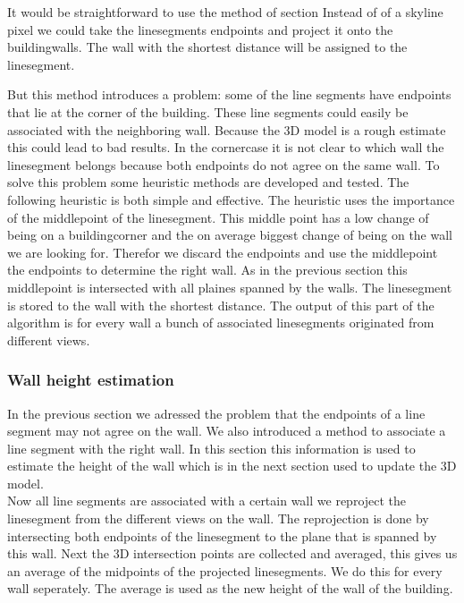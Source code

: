 	It would be straightforward to use the method of section %
	Instead of of a skyline pixel we could take the linesegments endpoints and project it onto the buildingwalls. The wall with the shortest distance will be assigned to the linesegment.

	But this method introduces a problem: some of the line segments have endpoints that lie at the corner of the building. These line segments could easily be associated with the neighboring wall. Because the 3D model is a rough estimate this could lead to bad results.
	In the cornercase it is not clear to which wall the linesegment belongs because both endpoints do not agree on the same wall. To solve this problem some heuristic methods are developed and tested. The following heuristic is both simple and effective.
	The heuristic uses the importance of the middlepoint of the linesegment. This middle point has a low change of being on a buildingcorner and the on average biggest change of being on the wall we are looking for.
	Therefor we discard the endpoints and use the middlepoint the endpoints to determine the right wall.
	As in the previous section %
	this middlepoint is intersected with all plaines spanned by the walls. The linesegment is stored to the wall with the shortest distance.
	The output of this part of the algorithm is for every wall a bunch of associated linesegments originated from different views.


\subsubsection{Wall height estimation}


	In the previous section we adressed the problem that the endpoints of a line segment may not agree on the wall.  We also introduced a method to associate a line segment with the right wall. In this section this information is used to estimate the height of the wall which is in the next section used to update the 3D model.\\
	Now all line segments are associated with a certain wall we reproject the linesegment from the different views on the wall. The reprojection is done by intersecting both endpoints of the linesegment to the plane that is spanned by this wall.
	Next the 3D intersection points are collected and averaged, this gives us an average of the midpoints of the projected linesegments. We do this for every wall seperately.
	The average is used as the new height of the wall of the building.

